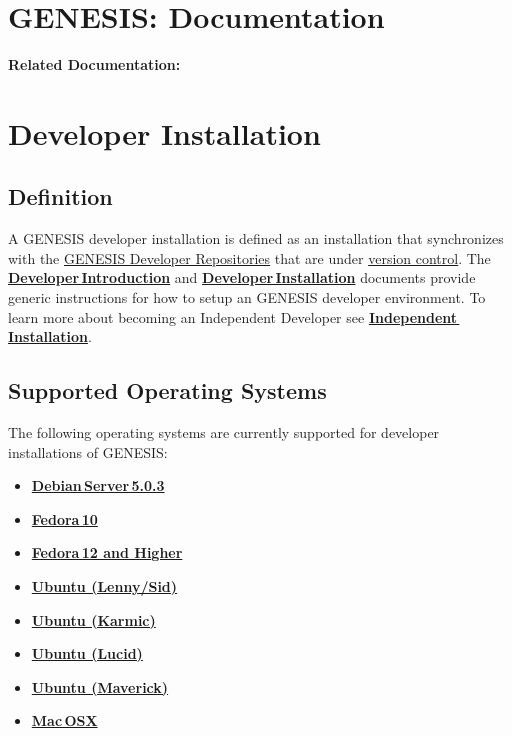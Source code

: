 \documentclass[12pt]{article}
\begin{document}
\section*{GENESIS: Documentation}

{\bf Related Documentation:} \\

\section*{Developer Installation}

\subsection*{Definition}


A GENESIS developer installation is defined as an installation that
synchronizes with the
\href{../developer-repository/developer-repository.tex}{GENESIS
  Developer Repositories} that are under
\href{../version-control/version-control.tex}{version control}.
The~\href{../developer-intro/developer-intro.tex}{\bf
  Developer\,Introduction} and
\href{../installation-developer/installation-developer.tex}{\bf
  Developer\,Installation} documents provide generic instructions for
how to setup an GENESIS developer environment.  To learn more about
becoming an Independent Developer see
\href{../installation-independent/installation-independent.tex}{\bf
  Independent\,Installation}.

\subsection*{Supported Operating Systems}

The following operating systems are currently supported for developer installations of GENESIS:

\begin{itemize}
   \item[]\href{../installation-debian-server/installation-debian-server.tex}{\bf Debian\,Server\,5.0.3}
   \item[]\href{../installation-fedora10/installation-fedora10.tex}{\bf Fedora\,10}
   \item[]\href{../installation-fedora12/installation-fedora12.tex}{\bf Fedora\,12 and Higher}
   \item[]\href{../installation-ubuntu-lennysid/installation-ubuntu-lennysid.tex}{\bf Ubuntu (Lenny/Sid)}
   \item[]\href{../installation-ubuntu-karmic/installation-ubuntu-karmic.tex}{\bf Ubuntu (Karmic)}
   \item[]\href{../installation-ubuntu-lucid/installation-ubuntu-lucid.tex}{\bf Ubuntu (Lucid)}
   \item[]\href{../installation-ubuntu-maverick/installation-ubuntu-maverick.tex}{\bf Ubuntu (Maverick)}
   \item[]\href{../installation-osx/installation-osx.tex}{\bf Mac\,OSX}
\end{itemize}
\end{document}
